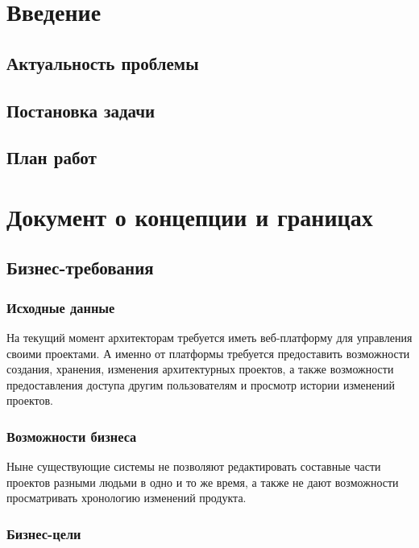 \documentclass[a4paper,14pt]{extreport} %
\begin{document}
\tableofcontents %


\chapter{Введение}
\section{Актуальность проблемы}

\newpage
\section{Постановка задачи}

\newpage
\section{План работ}

\newpage

\chapter{Документ о концепции и границах}
\section{Бизнес-требования}
\subsection{Исходные данные}

На текущий момент архитекторам требуется иметь веб-платформу для управления своими проектами. А именно от платформы требуется предоставить возможности создания, хранения, изменения архитектурных проектов, а также возможности предоставления  доступа другим пользователям и просмотр истории изменений проектов.


\subsection{Возможности бизнеса}

Ныне существующие системы не позволяют редактировать составные части проектов разными людьми в одно и то же время, а также не дают возможности просматривать хронологию изменений продукта.


\subsection{Бизнес-цели}
\end{document}
